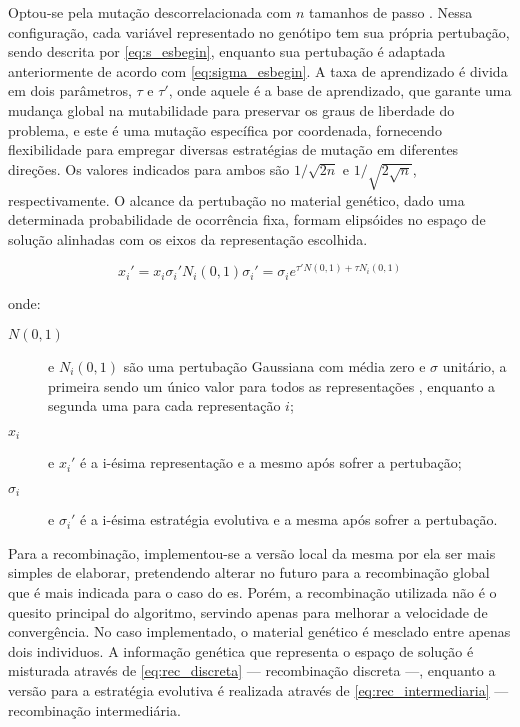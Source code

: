 Optou-se pela mutação descorrelacionada com $n$ tamanhos de passo
\cite[pp. 76--78]{eiben2003introduction}. Nessa configuração, cada
variável representado no genótipo tem sua própria pertubação, sendo
descrita por \ref{eq:s_esbegin}, enquanto sua pertubação é adaptada
anteriormente de acordo com \ref{eq:sigma_esbegin}. A taxa de
aprendizado é divida em dois parâmetros, $\tau$ e $\tau'$, onde aquele
é a base de aprendizado, que garante uma mudança global na
mutabilidade para preservar os graus de liberdade do problema, e este
é uma mutação específica por coordenada, fornecendo flexibilidade para
empregar diversas estratégias de mutação em diferentes direções. Os
valores indicados para ambos são $1/\sqrt{2n}$ e $1/\sqrt{2\sqrt{n}}$,
respectivamente. O alcance da pertubação no material genético, dado uma
determinada probabilidade de ocorrência fixa, formam elipsóides no
espaço de solução alinhadas com os eixos da representação escolhida. 

\begin{subequations}
\begin{equation}\label{eq:s_esbegin}
x_i' = x_i\sigma_i'N_i(0,1)
\end{equation}
\begin{equation}\label{eq:sigma_esbegin}
\sigma_i' = \sigma_ie^{\tau'N(0,1)+\tau N_i(0,1)}
\end{equation}
\end{subequations}

\noindent onde: 

\begin{description}
\item[$N(0,1)$] e $N_i(0,1)$ são uma pertubação Gaussiana com média
zero e $\sigma$ unitário, a primeira sendo um único valor para todos
as representações , enquanto a segunda uma para cada representação $i$; 
\item[$x_i$] e $x_i'$ é a i-ésima representação e a mesmo após sofrer a
pertubação;
\item[$\sigma_i$] e $\sigma_i'$ é a i-ésima estratégia evolutiva e a
mesma após sofrer a pertubação.
\end{description}

Para a recombinação, implementou-se a versão local da mesma por ela
ser mais simples de elaborar, pretendendo alterar no futuro para
a recombinação global que é mais indicada para o caso do \acs{es}.
Porém, a recombinação utilizada não é o quesito principal do
algoritmo, servindo apenas para melhorar a velocidade de convergência.
No caso implementado, o material genético é mesclado entre apenas
dois individuos. A informação genética que representa o espaço de
solução é misturada através de \ref{eq:rec_discreta} --- recombinação discreta
---, enquanto a versão para a estratégia evolutiva é realizada através
de \ref{eq:rec_intermediaria} --- recombinação intermediária.

